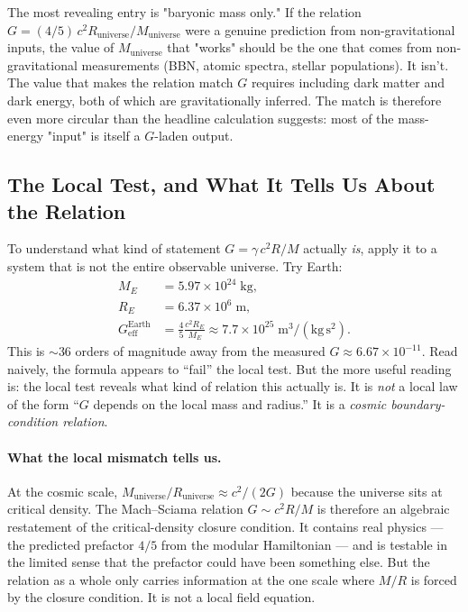 \documentclass[11pt,letterpaper]{article}
\newcommand{\Runiv}{R_{\mathrm{universe}}}
\newcommand{\Muniv}{M_{\mathrm{universe}}}
\begin{document}
The most revealing entry is "baryonic mass only." If the relation
$G = (4/5)\, c^2\Runiv/\Muniv$ were a genuine prediction from
non-gravitational inputs, the value of $\Muniv$ that "works" should
be the one that comes from non-gravitational measurements (BBN,
atomic spectra, stellar populations). It isn't. The value that makes
the relation match $G$ requires including dark matter and dark
energy, both of which are gravitationally inferred. The match is
therefore even more circular than the headline calculation suggests:
most of the mass-energy "input" is itself a $G$-laden output.

\subsection{The Local Test, and What It Tells Us About the Relation}
\label{sec:local_test}

To understand what kind of statement $G = \gamma\, c^2 R/M$ actually
\emph{is}, apply it to a system that is not the entire observable
universe. Try Earth:
\begin{align}
  M_E &= 5.97 \times 10^{24}\;\mathrm{kg}, \\
  R_E &= 6.37 \times 10^{6}\;\mathrm{m}, \\
  G_{\mathrm{eff}}^{\mathrm{Earth}} &= \frac{4}{5} \frac{c^2 R_E}{M_E}
    \approx 7.7 \times 10^{25}\;\mathrm{m^3/(kg\,s^2)}.
\end{align}
This is $\sim 36$ orders of magnitude away from the measured
$G \approx 6.67 \times 10^{-11}$. Read naively, the formula appears
to ``fail'' the local test. But the more useful reading is: the
local test reveals what kind of relation this actually is. It is
\emph{not} a local law of the form ``$G$ depends on the local mass
and radius.'' It is a \emph{cosmic boundary-condition relation}.

\paragraph{What the local mismatch tells us.}
At the cosmic scale, $\Muniv/\Runiv \approx c^2/(2 G)$ because the
universe sits at critical density. The Mach--Sciama relation
$G \sim c^2 R/M$ is therefore an algebraic restatement of the
critical-density closure condition. It contains real physics --- the
predicted prefactor $4/5$ from the modular Hamiltonian --- and is
testable in the limited sense that the prefactor could have been
something else. But the relation as a whole only carries information
at the one scale where $M/R$ is forced by the closure condition. It
is not a local field equation.
\end{document}
